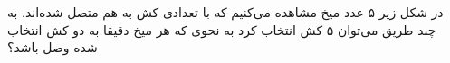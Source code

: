 \p
در شکل زیر ۵ عدد میخ مشاهده می‌کنیم که با تعدادی کش به هم متصل شده‌اند. به چند طریق می‌توان ۵ کش انتخاب کرد به نحوی که هر میخ دقیقا به دو کش انتخاب شده وصل باشد؟
